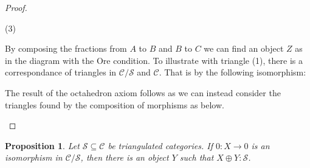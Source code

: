 \documentclass[12pt]{article}
\newtheorem{prop}[theorem]{Proposition}
\theoremstyle{definition}
\theoremstyle{remark}
\begin{document}
\begin{proof}
\begin{center}
                    (3)
                \end{center}
                By composing the fractions from $A$ to $B$ and $B$ to $C$ we can find an object $Z$ as in the diagram with the Ore condition. To illustrate with triangle (1), there is a correspondance of triangles in $\mathcal{C}/\mathcal{S}$ and $\mathcal{C}$. That is by the following isomorphism:
                \begin{center}
                \end{center}
                The result of the octahedron axiom follows as we can instead consider the triangles found by the composition of morphisms as below.
                \begin{center}
                \end{center}
            \end{proof}

            \begin{prop}
                Let $\mathcal{S}\subseteq\mathcal{C}$ be triangulated categories. If $0:X\rightarrow 0$ is an isomorphism in $\mathcal{C}/\mathcal{S}$, then there is an object $Y$ such that $X\oplus Y:\mathcal{S}$.
            \end{prop}
\end{document}
